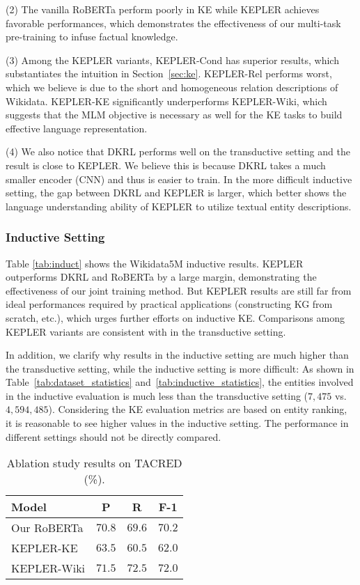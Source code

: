 (2) The vanilla RoBERTa perform poorly in KE while KEPLER achieves favorable performances, which demonstrates the effectiveness of our multi-task pre-training to infuse factual knowledge. 

(3) Among the KEPLER variants, KEPLER-Cond has superior results, which substantiates the intuition in Section~\ref{sec:ke}. KEPLER-Rel performs worst, which we believe is due to the short and homogeneous relation descriptions of Wikidata. KEPLER-KE significantly underperforms KEPLER-Wiki, which suggests that the MLM objective is necessary as well for the KE tasks to build effective language representation.

(4) We also notice that DKRL performs well on the transductive setting and the result is close to KEPLER. We believe this is because DKRL takes a much smaller encoder (CNN) and thus is easier to train. In the more difficult inductive setting, the gap between DKRL and KEPLER is larger, which better shows the language understanding ability of KEPLER to utilize textual entity descriptions.



\subsubsection*{Inductive Setting}

Table \ref{tab:induct} shows the Wikidata5M inductive results. KEPLER outperforms DKRL and RoBERTa by a large margin, demonstrating the effectiveness of our joint training method. But KEPLER results are still far from ideal performances required by practical applications (constructing KG from scratch, etc.), which urges further efforts on inductive KE. Comparisons among KEPLER variants are consistent with in the transductive setting. 

In addition, we clarify why results in the inductive setting are much higher than the transductive setting, while the inductive setting is more difficult: As shown in Table~\ref{tab:dataset_statistics} and~\ref{tab:inductive_statistics}, the entities involved in the inductive evaluation is much less than the transductive setting ($7,475$ vs. $4,594,485$). Considering the KE evaluation metrics are based on entity ranking, it is reasonable to see higher values in the inductive setting. The performance in different settings should not be directly compared.




\begin{table}[t]
    \tablefont
	\centering
	\begin{adjustbox}{max width=0.98\linewidth}
	\begin{tabular}{lccc}
	\toprule
		\textbf{Model} & \textbf{P} & \textbf{R} & \textbf{F-1}\\
	\midrule
Our RoBERTa & $70.8$ & $69.6$ & $70.2$\\
		KEPLER-KE & $63.5$ & $60.5$ & $62.0$ \\
		KEPLER-Wiki & $71.5$ & $72.5$ & $72.0$\\
	\bottomrule
	\end{tabular}
	\end{adjustbox}
	\caption{Ablation study results on TACRED (\%).}\label{tab:abl}
\end{table}
